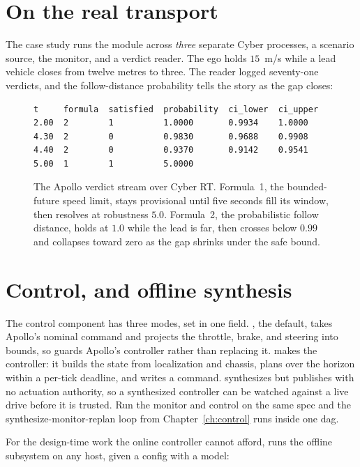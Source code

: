 \section{On the real transport}

The  case study runs the module across \emph{three} separate Cyber processes, a scenario source, the monitor, and a verdict reader. The ego holds $15$~m/s while a lead vehicle closes from twelve metres to three. The reader logged seventy-one verdicts, and the follow-distance probability tells the story as the gap closes:

\begin{figure}[h]
\centering
\begin{lstlisting}
t     formula  satisfied  probability  ci_lower  ci_upper
2.00  2        1          1.0000       0.9934    1.0000
4.30  2        0          0.9830       0.9688    0.9908
4.40  2        0          0.9370       0.9142    0.9541
5.00  1        1          5.0000
\end{lstlisting}
\caption{The Apollo verdict stream over Cyber RT. Formula~1, the bounded-future speed limit, stays provisional until five seconds fill its window, then resolves at robustness $5.0$. Formula~2, the probabilistic follow distance, holds at $1.0$ while the lead is far, then crosses below $0.99$ and collapses toward zero as the gap shrinks under the safe bound.}
\end{figure}

\section{Control, and offline synthesis}

The control component has three modes, set in one field. , the default, takes Apollo's nominal command and projects the throttle, brake, and steering into bounds, so \sentil{} guards Apollo's controller rather than replacing it.  makes \sentil{} the controller: it builds the state from localization and chassis, plans over the horizon within a per-tick deadline, and writes a command.  synthesizes but publishes with no actuation authority, so a synthesized controller can be watched against a live drive before it is trusted. Run the monitor and control on the same spec and the synthesize-monitor-replan loop from Chapter~\ref{ch:control} runs inside one dag.

For the design-time work the online controller cannot afford,  runs the offline subsystem on any host, given a config with a model:

